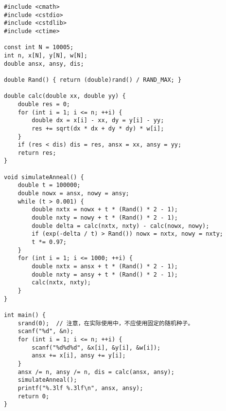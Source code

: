 \begin{lstlisting}
#include <cmath>
#include <cstdio>
#include <cstdlib>
#include <ctime>

const int N = 10005;
int n, x[N], y[N], w[N];
double ansx, ansy, dis;

double Rand() { return (double)rand() / RAND_MAX; }

double calc(double xx, double yy) {
	double res = 0;
	for (int i = 1; i <= n; ++i) {
		double dx = x[i] - xx, dy = y[i] - yy;
		res += sqrt(dx * dx + dy * dy) * w[i];
	}
	if (res < dis) dis = res, ansx = xx, ansy = yy;
	return res;
}

void simulateAnneal() {
	double t = 100000;
	double nowx = ansx, nowy = ansy;
	while (t > 0.001) {
		double nxtx = nowx + t * (Rand() * 2 - 1);
		double nxty = nowy + t * (Rand() * 2 - 1);
		double delta = calc(nxtx, nxty) - calc(nowx, nowy);
		if (exp(-delta / t) > Rand()) nowx = nxtx, nowy = nxty;
		t *= 0.97;
	}
	for (int i = 1; i <= 1000; ++i) {
		double nxtx = ansx + t * (Rand() * 2 - 1);
		double nxty = ansy + t * (Rand() * 2 - 1);
		calc(nxtx, nxty);
	}
}

int main() {
	srand(0);  // 注意，在实际使用中，不应使用固定的随机种子。
	scanf("%d", &n);
	for (int i = 1; i <= n; ++i) {
		scanf("%d%d%d", &x[i], &y[i], &w[i]);
		ansx += x[i], ansy += y[i];
	}
	ansx /= n, ansy /= n, dis = calc(ansx, ansy);
	simulateAnneal();
	printf("%.3lf %.3lf\n", ansx, ansy);
	return 0;
}
\end{lstlisting}